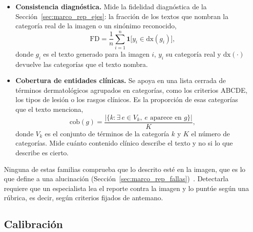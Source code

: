 \begin{itemize}
    \item \textbf{Consistencia diagnóstica.} Mide la fidelidad diagnóstica de la
    Sección~\ref{sec:marco_rep_ejes}: la fracción de los textos que nombran la categoría real de la imagen o un
    sinónimo reconocido,
    \begin{equation}
        \mathrm{FD} = \frac{1}{n}\sum_{i=1}^{n} \mathbf{1}\bigl[y_i \in \mathrm{dx}(g_i)\bigr],
        \label{eq:marco_fd}
    \end{equation}
    donde $g_i$ es el texto generado para la imagen $i$, $y_i$ su categoría real y $\mathrm{dx}(\cdot)$ devuelve las categorías que el texto nombra.

    \item \textbf{Cobertura de entidades clínicas.} Se apoya en una lista cerrada de términos dermatológicos agrupados en categorías, como los criterios ABCDE, los tipos de lesión o los rasgos clínicos. Es la proporción de esas categorías que el texto menciona,
    \begin{equation}
        \mathrm{cob}(g) = \frac{\bigl|\{k : \exists\, e \in V_k,\ e \text{ aparece en } g\}\bigr|}{K},
        \label{eq:marco_cobertura_ent}
    \end{equation}
    donde $V_k$ es el conjunto de términos de la categoría $k$ y $K$ el número de categorías. Mide cuánto
    contenido clínico describe el texto y no si lo que describe es cierto.
\end{itemize}

Ninguna de estas familias comprueba que lo descrito esté en la imagen, que es lo que define a una alucinación
(Sección~\ref{sec:marco_rep_fallas})~\cite{hartsock2024vision}. Detectarla requiere que un especialista lea el
reporte contra la imagen y lo puntúe según una rúbrica, es decir, según criterios fijados de antemano.

\subsection{Calibración}
\label{sec:marco_eval_calib}

